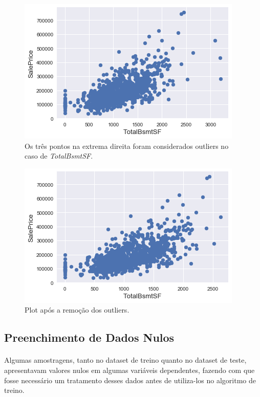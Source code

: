 \documentclass{article}
\begin{document}
			\begin{figure}[H]
				\centering
				\includegraphics[scale=0.8]{../img/totalbsmtsf_outliers}
				\caption{Os três pontos na extrema direita foram considerados outliers no caso de \textit{TotalBsmtSF}.}
			\end{figure}
			
			\begin{figure}[H]
				\centering
				\includegraphics[scale=0.8]{../img/totalbsmtsf_no_outliers}
				\caption{Plot após a remoção dos outliers.}
			\end{figure}
		
		\subsection{Preenchimento de Dados Nulos}
			\paragraph{}Algumas amostragens, tanto no dataset de treino quanto no dataset de teste, apresentavam valores nulos em algumas variáveis dependentes, fazendo com que fosse necessário um tratamento desses dados antes de utiliza-los no algoritmo de treino.
			
\end{document}

